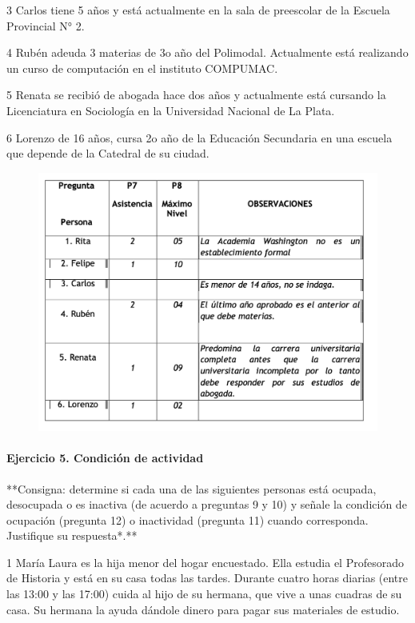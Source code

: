 \documentclass[
  openany]{book}
\begin{document}
3 Carlos tiene 5 años y está actualmente en la sala de preescolar de la Escuela Provincial N° 2.

4 Rubén adeuda 3 materias de 3o año del Polimodal. Actualmente está realizando un curso de computación en el instituto COMPUMAC.

5 Renata se recibió de abogada hace dos años y actualmente está cursando la Licenciatura en Sociología en la Universidad Nacional de La Plata.

6 Lorenzo de 16 años, cursa 2o año de la Educación Secundaria en una escuela que depende de la Catedral de su ciudad.

\begin{figure}

{\centering \includegraphics[width=1\linewidth]{imagenes/figura6-149} 

}

\end{figure}

\hypertarget{ejercicio-5.-condiciuxf3n-de-actividad-1}{%
\paragraph{Ejercicio 5. Condición de actividad}\label{ejercicio-5.-condiciuxf3n-de-actividad-1}}

**Consigna: determine si cada una de las siguientes personas está ocupada, desocupada o es inactiva (de acuerdo a preguntas 9 y 10) y señale la condición de ocupación (pregunta 12) o inactividad (pregunta 11) cuando corresponda. Justifique su respuesta*.**

1 María Laura es la hija menor del hogar encuestado. Ella estudia el Profesorado de Historia y está en su casa todas las tardes. Durante cuatro horas diarias (entre las 13:00 y las 17:00) cuida al hijo de su hermana, que vive a unas cuadras de su casa. Su hermana la ayuda dándole dinero para pagar sus materiales de estudio.
\end{document}
